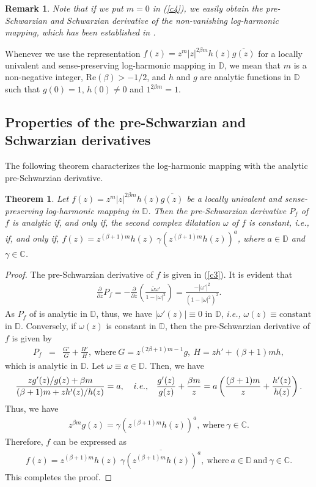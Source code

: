 \documentclass[12pt,reqno]{amsart}
\newtheorem{thm}{Theorem}[section]
\newtheorem{rem}{Remark}[section]
\newtheorem{open problem}{Open problem}[section]
\newcommand{\ol}{\overline}
\newcommand{\beas}{\begin{eqnarray*}}
\newcommand{\eeas}{\end{eqnarray*}}
\renewcommand{\phi}{\varphi}
\numberwithin{equation}{section}
\begin{document}
\begin{rem} Note that if we put $m=0$ in (\ref{c4}), we easily obtain the pre-Schwarzian and Schwarzian derivative of the non-vanishing log-harmonic mapping, which has been established in \cite{BHPV2022}.\end{rem}
Whenever we use the representation $f(z)=z^m|z|^{2\beta m} h(z)\ol{g(z)}$ for a locally univalent and sense-preserving log-harmonic mapping in $\mathbb{D}$, we mean that $m$ is a non-negative integer, $\text{Re}(\beta)>-1/2$, and $h$ and $g$ are analytic functions in $\mathbb{D}$ such that $g(0)=1$, $h(0)\not=0$ and $1^{2\beta m}=1$.
\subsection{Properties of the pre-Schwarzian and Schwarzian derivatives}
The following theorem characterizes the log-harmonic mapping with the analytic pre-Schwarzian derivative.
\begin{thm}\label{Theo2}
Let $f(z)=z^m|z|^{2\beta m} h(z)\ol{g(z)}$ be a locally univalent and sense-preserving log-harmonic mapping in $\mathbb{D}$. Then the pre-Schwarzian derivative $P_f$ of $f$ is analytic if, 
and only if, the second complex dilatation $\omega$ of $f$ is constant, {\it i.e.}, if, and only if, $f(z)=z^{(\beta+1) m} h(z)\;\ol{\gamma\left(z^{(\beta+1) m} h(z)\right)^a}$, where 
$a\in\mathbb{D}$ and $\gamma\in\mathbb{C}$.
\end{thm}
\begin{proof} The pre-Schwarzian derivative of $f$ is given in (\ref{c3}). It is evident that 
\beas \frac{\partial }{\partial \ol{z}}P_f=- \frac{\partial }{\partial \ol{z}}\left(\frac{\ol{\omega}\omega'}{1-|\omega|^2}\right)=\frac{-|\omega'|^2}{(1-|\omega|^2)^2}.\eeas
As $P_f$ of is analytic in $\mathbb{D}$, thus, we have $|\omega'(z)|\equiv 0$ in $\mathbb{D}$, {\it i.e.,} $\omega(z)\equiv \text{constant}$ in $\mathbb{D}$. Conversely, if $\omega(z)$ is constant in $\mathbb{D}$, then the pre-Schwarzian derivative of $f$ is given by 
\beas P_f&=&\frac{G'}{G}+\frac{H'}{H},~\text{where}~G=z^{(2\beta+1)m-1}g,~ H=zh'+(\beta+1)m h,\eeas
which is analytic in $\mathbb{D}$. Let $\omega\equiv a\in\mathbb{D}$. Then, we have  
\beas \frac{z g'(z)/g(z)+\beta m}{(\beta+1)m+z h'(z)/h(z)}=a,\quad{\it i.e.,}\quad \frac{g'(z)}{g(z)}+\frac{\beta m}{z}=a\left(\frac{(\beta+1)m}{z}+\frac{h'(z)}{h(z)}\right).\eeas
Thus, we have
\beas z^{\beta m}g(z)=\gamma\left(z^{(\beta+1)m} h(z)\right)^a,~\text{where}~\gamma\in\mathbb{C}.\eeas
Therefore, $f$ can be expressed as
\beas f(z)=z^{(\beta+1) m} h(z)\;\ol{\gamma\left(z^{(\beta+1) m} h(z)\right)^a},~\text{where}~ a\in\mathbb{D}~\text{and}~\gamma\in\mathbb{C}.\eeas
This completes the proof.
\end{proof}
\end{document}
